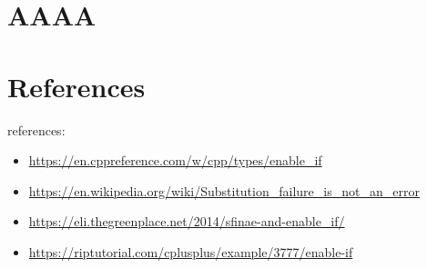 \documentclass[11pt,a4paper]{article}
\begin{document}
\section{AAAA}

\section{References}


references:
\begin{itemize}
\item \url{https://en.cppreference.com/w/cpp/types/enable_if}
\item \url{https://en.wikipedia.org/wiki/Substitution_failure_is_not_an_error}
\item \url{https://eli.thegreenplace.net/2014/sfinae-and-enable_if/}
\item \url{https://riptutorial.com/cplusplus/example/3777/enable-if}
\end{itemize}
\end{document}
